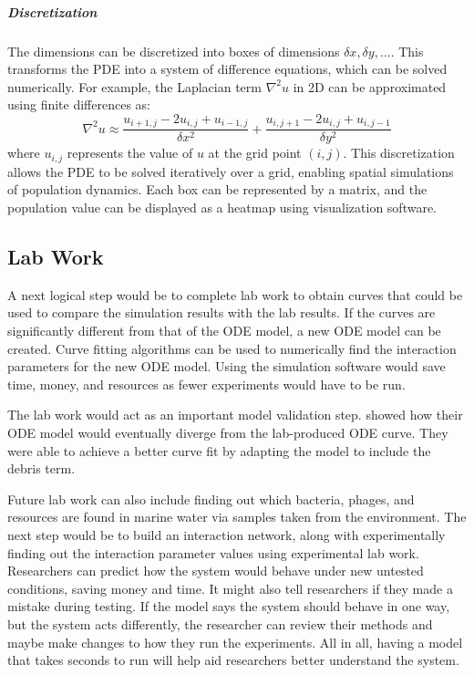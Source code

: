 \subparagraph{Discretization}
The dimensions can be discretized into boxes of dimensions $\delta x, \delta y, \dots$. 
This transforms the PDE into a system of difference equations, which can be solved numerically. 
For example, the Laplacian term $\nabla^2 u$ in 2D can be approximated using finite differences as:
\[
    \nabla^2 u \approx \frac{u_{i+1,j} - 2u_{i,j} + u_{i-1,j}}{\delta x^2} + \frac{u_{i,j+1} - 2u_{i,j} + u_{i,j-1}}{\delta y^2}
\]
where $u_{i,j}$ represents the value of $u$ at the grid point $(i, j)$. 
This discretization allows the PDE to be solved iteratively over a grid, enabling spatial simulations of population dynamics. 
Each box can be represented by a matrix, and the population value can be displayed as a heatmap using visualization software. 

\subsection{Lab Work}
A next logical step would be to complete lab work to obtain curves that could be used to compare the simulation results with the lab results. 
If the curves are significantly different from that of the ODE model, a new ODE model can be created. 
Curve fitting algorithms can be used to numerically find the interaction parameters for the new ODE model. 
Using the simulation software would save time, money, and resources as fewer experiments would have to be run. 

The lab work would act as an important model validation step. 
\citet{deyEmergentHigherorderInteractions2025} showed how their ODE model would eventually diverge from the lab-produced ODE curve. 
They were able to achieve a better curve fit by adapting the model to include the debris term. 

Future lab work can also include finding out which bacteria, phages, and resources are found in marine water via samples taken from the environment. 
The next step would be to build an interaction network, along with experimentally finding out the interaction parameter values using experimental lab work. 
Researchers can predict how the system would behave under new untested conditions, saving money and time. 
It might also tell researchers if they made a mistake during testing. 
If the model says the system should behave in one way, but the system acts differently, the researcher can review their methods and maybe make changes to how they run the experiments. 
All in all, having a model that takes seconds to run will help aid researchers better understand the system. 

